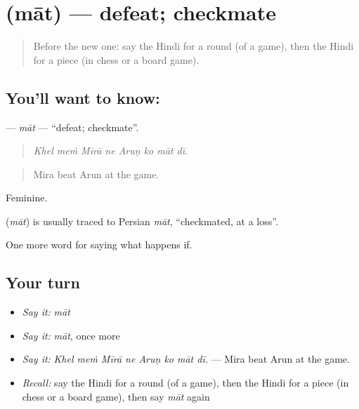 \section[\texorpdfstring{\hi{मात} (māt)}{मात (māt)}]{ (māt) — defeat; checkmate}

\label{lesson:HI-C545-mat}



\begin{quote}
Before the new one: say the Hindi for a round (of a game), then the Hindi for a piece (in chess or a board game).
\end{quote}

\subsection*{You'll want to know: }
\textbf{} — \emph{māt} — \textquotedblleft{}defeat; checkmate\textquotedblright{}.

\begin{quote}
       
\end{quote}

\begin{quote}
\emph{Khel meṁ Mīrā ne Aruṇ ko māt dī.}
\end{quote}

\begin{quote}
Mira beat Arun at the game.
\end{quote}

Feminine.

\begin{cousinweb}
\textbf{} (\emph{māt}) is usually traced to Persian \emph{māt}, \textquotedblleft{}checkmated, at a loss\textquotedblright{}.
\end{cousinweb}

\begin{grammarlens}[title={What you've built}]
One more word for saying what happens if.
\end{grammarlens}

\subsection*{Your turn}
\begin{itemize}
\raggedright
  \item \emph{Say it:} \emph{māt}
  \item \emph{Say it:} \emph{māt}, once more
  \item \emph{Say it:} \emph{Khel meṁ Mīrā ne Aruṇ ko māt dī.} — Mira beat Arun at the game.
  \item \emph{Recall:} say the Hindi for a round (of a game), then the Hindi for a piece (in chess or a board game), then say \emph{māt} again
\end{itemize}

